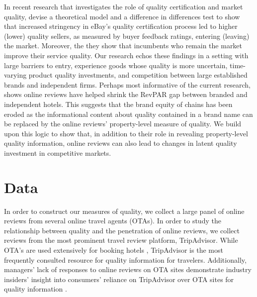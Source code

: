 \documentclass[mksc,blindrev]{informs3} %
\begin{document}
In recent research that investigates the role of quality certification and market quality, \citet{hui2018certification} devise a theoretical model and a difference in differences test to show that increased stringency in eBay's quality certification process led to higher (lower) quality sellers, as measured by buyer feedback ratings, entering (leaving) the market. Moreover, the they show that incumbents who remain the market improve their service quality. Our research echos these findings in a setting with large barriers to entry, experience goods whose quality is more uncertain, time-varying product quality investments, and competition between large established brands and independent firms. Perhaps most informative of the current research, \citet{hollenbeck2018} shows online reviews have helped shrink the RevPAR gap between branded and independent hotels. This suggests that the brand equity of chains has been eroded as the informational content about quality contained in a brand name can be replaced by the online reviews' property-level measure of quality. We build upon this logic to show that, in addition to their role in revealing property-level quality information, online reviews can also lead to changes in latent quality investment in competitive markets.

\section{Data}\label{sec:data}

In order to construct our measures of quality, we collect a large panel of online reviews from several online travel agents (OTAs). In order to study the relationship between quality and the penetration of online reviews, we collect reviews from the most prominent travel review platform, TripAdvisor. While OTA's are used extensively for booking hotels \citep{LVsurvey2016}, TripAdvisor is the most frequently consulted resource for quality information for travelers. Additionally, managers' lack of responses to online reviews on OTA sites demonstrate industry insiders' insight into consumers' reliance on TripAdvisor over OTA sites for quality information \citep{proserpio2017online}.

\end{document}

